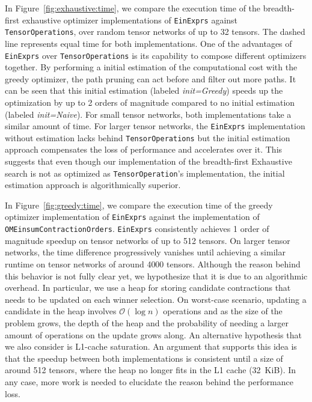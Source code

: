 \documentclass{juliacon}
\begin{document}
In Figure~\ref{fig:exhaustive:time}, we compare the execution time of the breadth-first exhaustive optimizer implementations of \texttt{EinExprs} against \texttt{TensorOperations}, over random tensor networks of up to 32 tensors.
The dashed line represents equal time for both implementations. One of the advantages of \texttt{EinExprs} over \texttt{TensorOperations} is its capability to compose different optimizers together. By performing a initial estimation of the computational cost with the greedy optimizer, the path pruning can act before and filter out more paths. It can be seen that this initial estimation (labeled \textit{init=Greedy}) speeds up the optimization by up to 2 orders of magnitude compared to no initial estimation (labeled \textit{init=Naive}).
For small tensor networks, both implementations take a similar amount of time.
For larger tensor networks, the \texttt{EinExprs} implementation without estimation lacks behind \texttt{TensorOperations} but the initial estimation approach compensates the loss of performance and accelerates over it.
This suggests that even though our implementation of the breadth-first Exhaustive search is not as optimized as \texttt{TensorOperation}'s implementation, the initial estimation approach is algorithmically superior.

In Figure~\ref{fig:greedy:time}, we compare the execution time of the greedy optimizer implementation of \texttt{EinExprs} against the implementation of \texttt{OMEinsumContractionOrders}.
\texttt{EinExprs} consistently achieves 1 order of magnitude speedup on tensor networks of up to 512 tensors.
On larger tensor networks, the time difference progressively vanishes until achieving a similar runtime on tensor networks of around 4000 tensors.
Although the reason behind this behavior is not fully clear yet, we hypothesize that it is due to an algorithmic overhead.
In particular, we use a heap for storing candidate contractions that needs to be updated on each winner selection.
On worst-case scenario, updating a candidate in the heap involves $\mathcal{O}(\log n)$ operations and as the size of the problem grows, the depth of the heap and the probability of needing a larger amount of operations on the update grows along.
An alternative hypothesis that we also consider is L1-cache saturation.
An argument that supports this idea is that the speedup between both implementations is consistent until a size of around 512 tensors, where the heap no longer fits in the L1 cache (32~KiB).
In any case, more work is needed to elucidate the reason behind the performance loss.
\end{document}
